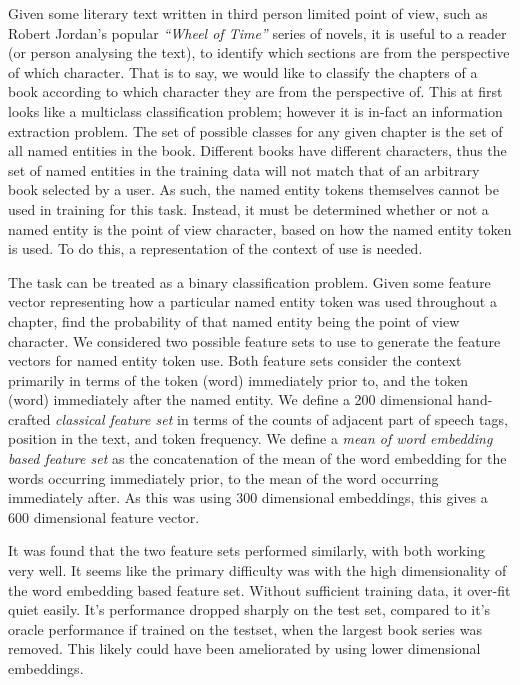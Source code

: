 \documentclass{book}
\begin{document}
Given some literary text written in third person limited point of view, such as Robert Jordan's popular \textit{``Wheel of Time''} series of novels,
it is useful to a reader (or person analysing the text), to identify which sections are from the perspective of which character.
That is to say, we would like to classify the chapters of a book according to which character they are from the perspective of.
This at first looks like a multiclass classification problem;
however it is in-fact an information extraction problem.
The set of possible classes for any given chapter is the set of all named entities in the book.
Different books have different characters,
thus the set of named entities in the training data will not match that of an arbitrary book selected by a user.
As such, the named entity tokens themselves cannot be used in training for this task.
Instead, it must be determined whether or not a named entity is the point of view character, based on how the named entity token is used.
To do this, a representation of the context of use is needed.


The task can be treated as a binary classification problem.
Given some feature vector representing how a particular named entity token was used throughout a chapter,
find the probability of that named entity being the point of view character.
We considered two possible feature sets to use to generate the feature vectors for named entity token use.
Both feature sets consider the context primarily in terms of the token (word) immediately prior to, and the token (word) immediately after the named entity.
We define a 200 dimensional hand-crafted \emph{classical feature set} in terms of the counts of adjacent part of speech tags, position in the text, and token frequency.
We define a \emph{mean of word embedding based feature set} as the concatenation of the mean of the word embedding for the words occurring immediately prior, to the mean of the word occurring immediately after.
As this was using 300 dimensional embeddings, this gives a 600 dimensional feature vector.


It was found that the two feature sets performed similarly, with both working very well.
It seems like the primary difficulty was with the high dimensionality of the word embedding based feature set.
Without sufficient training data, it over-fit quiet easily.
It's performance dropped sharply on the test set, compared to it's oracle performance if trained on the testset,
when the largest book series was removed.
This likely could have been ameliorated by using lower dimensional embeddings.
\end{document}
